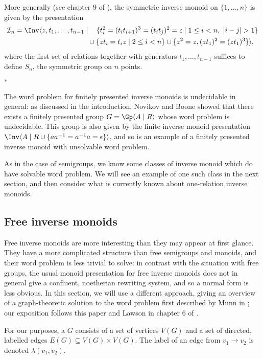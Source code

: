 \documentclass[noindex,noinsetproof,12pt]{lmaths}
\newcommand{\paradec}{\par\begin{center}$\ast$\end{center}}
\begin{document}
More generally (see chapter 9 of \cite{Lipscomb1996}), the symmetric inverse monoid on $\{1, \ldots, n\}$ is given by the presentation
\begin{align*}
	\mathcal{I}_n = \Inv \langle z, t_1, \ldots, t_{n-1} \mid & \quad\, \{ t_i^2 = (t_i t_{i+1})^3 = (t_i t_j)^2 = \epsilon \mid 1 \le i < n,\ |i-j|>1 \} \\
	& \cup \{ zt_i = t_iz \mid 2 \le i < n \} \cup \{ z^2 = z, (zt_1)^2 = (zt_1)^3 \} \rangle,
\end{align*}
where the first set of relations together with generators $t_1, \ldots, t_{n-1}$ suffices to define $S_n$, the symmetric group on $n$ points.


\paradec

The word problem for finitely presented inverse monoids is undecidable in general: as discussed in the introduction, Novikov and Boone showed that there exists a finitely presented group $G = \Gp \langle A \mid R \rangle$ whose word problem is undecidable. This group is also given by the finite inverse monoid presentation $\Inv \langle A \mid R \cup \{ aa^{-1} = a^{-1}a = \epsilon \} \rangle$, and so is an example of a finitely presented inverse monoid with unsolvable word problem.

As in the case of semigroups, we know some classes of inverse monoid which do have solvable word problem. We will see an example of one such class in the next section, and then consider what is currently known about one-relation inverse monoids. 

\subsection{Free inverse monoids} \label{sec:free-inverse-monoids}
Free inverse monoids are more interesting than they may appear at first glance. They have a more complicated structure than free semigroups and monoids, and their word problem is less trivial to solve: in contrast with the situation with free groups, the usual monoid presentation for free inverse monoids does not in general give a confluent, noetherian rewriting system, and so a normal form is less obvious. In this section, we will use a different approach, giving an overview of a graph-theoretic solution to the word problem first described by Munn in \cite{Munn1974}; our exposition follows this paper and Lawson in chapter 6 of \cite{Lawson1998}.

For our purposes, a  $G$ consists of a set of vertices $V(G)$ and a set of directed, labelled edges $E(G) \subseteq V(G) \times V(G)$. The label of an edge from $v_1 \to v_2$ is denoted $\lambda(v_1, v_2)$.
\end{document}
